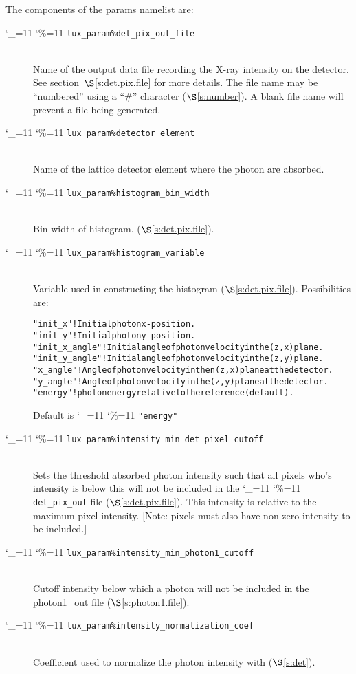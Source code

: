 \documentclass[11pt]{article}
\newcommand\ttcmd{\begingroup\catcode`\_=11 \catcode`\%=11 \dottcmd}
\newcommand\dottcmd[1]{\texttt{#1}\endgroup}
\newcommand{\vn}{\ttcmd}
\newcommand{\Newline}{\hfil \\}
\newcommand{\sref}[1]{$\S$\ref{#1}}
\newenvironment{example}
  {\vspace{\ExBeg} \begin{alltt}}
  {\end{alltt} \vspace{\ExEnd}}
\newlength{\ExBeg}
\newlength{\ExEnd}
\begin{document}
The components of the params namelist are:
  \begin{description}
  \item[\vn{lux_param\%det_pix_out_file}] \Newline
Name of the output data file recording the X-ray intensity on the
detector. See section~\sref{s:det.pix.file} for more details. The file
name may be ``numbered'' using a ``\#'' character (\sref{s:number}). A
blank file name will prevent a file being generated.

  \item[\vn{lux_param\%detector_element}] \Newline
Name of the lattice detector element where the photon are absorbed.

  \item[\vn{lux_param\%histogram_bin_width}] \Newline
Bin width of histogram. (\sref{s:det.pix.file}).

  \item[\vn{lux_param\%histogram_variable}] \Newline
Variable used in constructing the histogram (\sref{s:det.pix.file}).
Possibilities are:
\begin{example}
  "init_x"        ! Initial photon x-position.
  "init_y"        ! Initial photon y-position.
  "init_x_angle"  ! Initial angle of photon velocity in the (z,x) plane.
  "init_y_angle"  ! Initial angle of photon velocity in the (z,y) plane.
  "x_angle"       ! Angle of photon velocity in then (z,x) plane at the detector.
  "y_angle"       ! Angle of photon velocity in the (z,y) plane at the detector.
  "energy"        ! photon energy relative to the reference (default).
\end{example}
Default is \vn{"energy"}

  \item[\vn{lux_param\%intensity_min_det_pixel_cutoff}] \Newline
Sets the threshold absorbed photon intensity such that all pixels
who's intensity is below this will not be included in the
\vn{det_pix_out} file (\sref{s:det.pix.file}). This intensity is
relative to the maximum pixel intensity. [Note: pixels must also have
non-zero intensity to be included.]

  \item[\vn{lux_param\%intensity_min_photon1_cutoff}] \Newline
Cutoff intensity below which a photon will not be included in
the photon1_out file (\sref{s:photon1.file}).

  \item[\vn{lux_param\%intensity_normalization_coef}] \Newline
Coefficient used to normalize the photon intensity with (\sref{s:det}).


\end{description}
\end{document}
